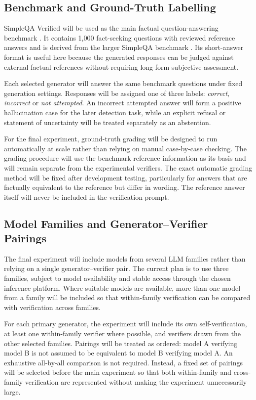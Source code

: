 \documentclass[11pt,a4paper]{article}
\begin{document}
	\subsection{Benchmark and Ground-Truth Labelling}
	
	SimpleQA Verified will be used as the main factual question-answering benchmark \cite{haas2025simpleqaverified}. It contains 1,000 fact-seeking questions with reviewed reference answers and is derived from the larger SimpleQA benchmark \cite{wei2024simpleqa}. Its short-answer format is useful here because the generated responses can be judged against external factual references without requiring long-form subjective assessment.
	
	Each selected generator will answer the same benchmark questions under fixed generation settings. Responses will be assigned one of three labels: \textit{correct}, \textit{incorrect} or \textit{not attempted}. An incorrect attempted answer will form a positive hallucination case for the later detection task, while an explicit refusal or statement of uncertainty will be treated separately as an abstention.
	
	For the final experiment, ground-truth grading will be designed to run automatically at scale rather than relying on manual case-by-case checking. The grading procedure will use the benchmark reference information as its basis and will remain separate from the experimental verifiers. The exact automatic grading method will be fixed after development testing, particularly for answers that are factually equivalent to the reference but differ in wording. The reference answer itself will never be included in the verification prompt.
	
	\subsection{Model Families and Generator--Verifier Pairings}
	
	The final experiment will include models from several LLM families rather than relying on a single generator--verifier pair. The current plan is to use three families, subject to model availability and stable access through the chosen inference platform. Where suitable models are available, more than one model from a family will be included so that within-family verification can be compared with verification across families.
	
	For each primary generator, the experiment will include its own self-verification, at least one within-family verifier where possible, and verifiers drawn from the other selected families. Pairings will be treated as ordered: model A verifying model B is not assumed to be equivalent to model B verifying model A. An exhaustive all-by-all comparison is not required. Instead, a fixed set of pairings will be selected before the main experiment so that both within-family and cross-family verification are represented without making the experiment unnecessarily large.
	
\end{document}
